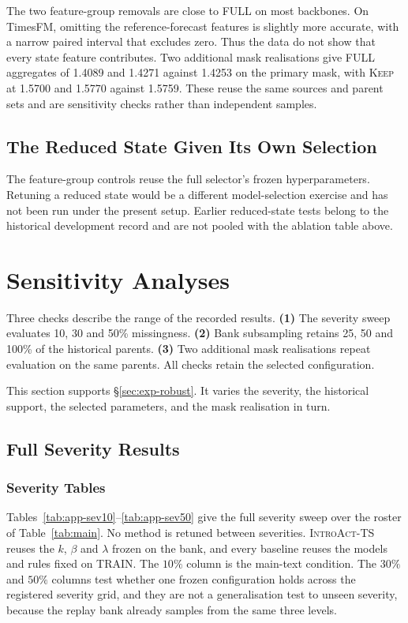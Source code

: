 \documentclass{article}
\newcommand{\introact}{\textsc{IntroAct-TS}}
\begin{document}
The two feature-group removals are close to FULL on most backbones. On TimesFM, omitting the
reference-forecast features is slightly more accurate, with a narrow paired interval that
excludes zero. Thus the data do not show that every state feature contributes. Two additional
mask realisations give FULL aggregates of 1.4089 and 1.4271 against 1.4253 on the primary
mask, with \textsc{Keep} at 1.5700 and 1.5770 against 1.5759. These reuse the same sources
and parent sets and are sensitivity checks rather than independent samples.

\subsection{The Reduced State Given Its Own Selection}
\label{app:compact-selection}
The feature-group controls reuse the full selector's frozen hyperparameters. Retuning a
reduced state would be a different model-selection exercise and has not been run under the
present setup. Earlier reduced-state tests belong to the historical development record
and are not pooled with the ablation table above.

\section{Sensitivity Analyses}

Three checks describe the range of the recorded results. \textbf{(1)} The severity sweep evaluates 10, 30 and 50\% missingness. \textbf{(2)} Bank subsampling retains 25, 50 and 100\% of the historical parents. \textbf{(3)} Two additional mask realisations repeat evaluation on the same parents. All checks retain the selected configuration.

This section supports \S\ref{sec:exp-robust}. It varies the severity, the historical
support, the selected parameters, and the mask realisation in turn.

\subsection{Full Severity Results}
\label{app:severity-full}

\subsubsection{Severity Tables}
\label{app:severity}
Tables~\ref{tab:app-sev10}--\ref{tab:app-sev50} give the full severity sweep over the roster of
Table~\ref{tab:main}. No method is retuned
between severities. \introact{} reuses the $k$, $\beta$ and $\lambda$ frozen on the bank, and every
baseline reuses the models and rules fixed on TRAIN. The $10\%$ column is the main-text
condition. The $30\%$ and $50\%$ columns test whether one frozen configuration holds across
the registered severity grid, and they are not a generalisation test to unseen severity,
because the replay bank already samples from the same three levels.
\end{document}
